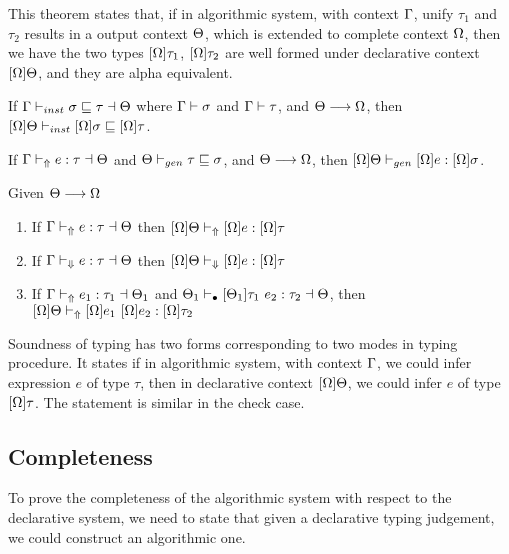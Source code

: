 This theorem states that, if in algorithmic system, with context $\Gamma$, unify $\tau_1$ and $\tau_2$ results in a output context $\Theta$, which is extended to complete context $\Omega$, then we have the two types $[\Omega]\tau_1$, $[\Omega]\tau_2$ are well formed under declarative context $[\Omega]\Theta$, and they are alpha equivalent.

\begin{theorem}

If $\Gamma {} \vdash_{inst} \sigma \sqsubseteq \tau \dashv \Theta$ where $\Gamma {} \vdash \sigma$ and $\Gamma {} \vdash \tau$,
and $\Theta \longrightarrow \Omega$,
then $[\Omega]\Theta \vdash_{inst} [\Omega]\sigma \sqsubseteq [\Omega]\tau$.
\end{theorem}

\begin{theorem}

If $\Gamma {} \vdash_\Uparrow e:\tau \dashv \Theta $ and $\Theta \vdash_{gen} \tau \sqsubseteq \sigma$,
and $\Theta \longrightarrow \Omega$,
then $[\Omega]\Theta \vdash_{gen} [\Omega]e:[\Omega]\sigma$.
\end{theorem}

\begin{theorem}

Given $\Theta \longrightarrow \Omega$
\begin{enumerate}
   \item If $\Gamma {} \vdash_\Uparrow e: \tau \dashv \Theta$ then $[\Omega]\Theta \vdash_\Uparrow [\Omega]e: [\Omega]\tau$
   \item If $\Gamma {} \vdash_\Downarrow e: \tau \dashv \Theta$ then $[\Omega]\Theta \vdash_\Downarrow [\Omega]e: [\Omega]\tau$
   \item If $\Gamma {} \vdash_\Uparrow e_1:\tau_1 \dashv \Theta_1$ and $\Theta_1 \vdash_\bullet [\Theta_1]\tau_1 ~ e_2 : \tau_2 \dashv \Theta$,
       then $[\Omega]\Theta \vdash_\Uparrow [\Omega]e_1 ~ [\Omega]e_2 : [\Omega]\tau_2$
\end{enumerate}
\end{theorem}

Soundness of typing has two forms corresponding to two modes in typing procedure. It states if in algorithmic system, with context $\Gamma$, we could infer expression $e$ of type $\tau$, then in declarative context $[\Omega]\Theta$, we could infer $e$ of type $[\Omega]\tau$. The statement is similar in the check case.

\subsection{Completeness}

To prove the completeness of the algorithmic system with respect to the declarative system, we need to state that given a declarative typing judgement, we could construct an algorithmic one.

